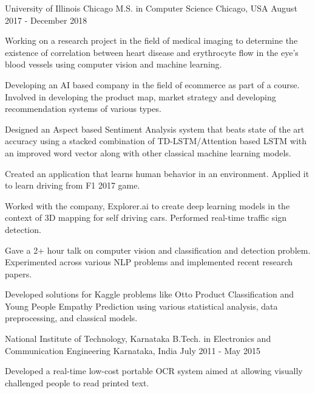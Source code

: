 

\begin{cventries}

  \cventry
    {University of Illinois Chicago} %
    {M.S. in Computer Science} %
    {Chicago, USA} %
    {August 2017 - December 2018} %
    {
      \begin{cvitems} %
        \item {Working on a research project in the field of medical imaging to determine the existence of correlation between heart disease and erythrocyte flow in the eye's blood vessels using computer vision and machine learning.}
        \item {Developing an AI based company in the field of ecommerce as part of a course. Involved in developing the product map, market strategy and developing recommendation systems of various types.}
        \item {Designed an Aspect based Sentiment Analysis system that beats state of the art accuracy using a stacked combination of TD-LSTM/Attention based LSTM with an improved word vector along with other classical machine learning models.}
        \item {Created an application that learns human behavior in an environment. Applied it to learn driving from F1 2017 game.}
        \item {Worked with the company, Explorer.ai to create deep learning models in the context of 3D mapping for self driving cars. Performed real-time traffic sign detection.}
        \item {Gave a 2+ hour talk on computer vision and classification and detection problem. Experimented across various NLP problems and implemented recent research papers.}
        \item {Developed solutions for Kaggle problems like Otto Product Classification and Young People Empathy Prediction using various statistical analysis, data preprocessing, and classical models.}
      \end{cvitems}
    }

  \cventry
    {National Institute of Technology, Karnataka} %
    {B.Tech. in Electronics and Communication Engineering} %
    {Karnataka, India} %
    {July 2011 - May 2015} %
    {
      \begin{cvitems} %
        \item {Developed a real-time low-cost portable OCR system aimed at allowing visually challenged people to read printed text.}
      \end{cvitems}
    }

\end{cventries}
